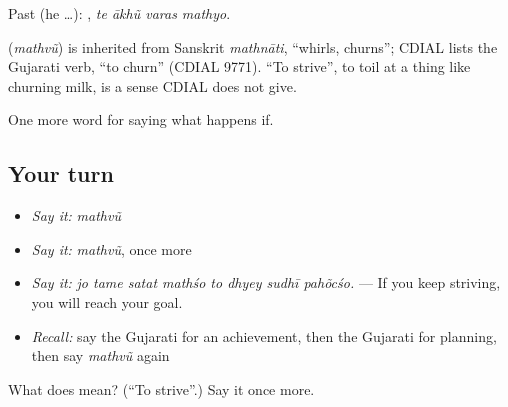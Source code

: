 Past (he …):    , \emph{te ākhũ varas mathyo}.

\begin{cousinweb}
\textbf{} (\emph{mathvũ}) is inherited from Sanskrit \emph{mathnāti}, \textquotedblleft{}whirls, churns\textquotedblright{}; CDIAL lists the Gujarati verb, \textquotedblleft{}to churn\textquotedblright{} (CDIAL 9771). \textquotedblleft{}To strive\textquotedblright{}, to toil at a thing like churning milk, is a sense CDIAL does not give.
\end{cousinweb}

\begin{grammarlens}[title={What you've built}]
One more word for saying what happens if.
\end{grammarlens}

\subsection*{Your turn}
\begin{itemize}
\raggedright
  \item \emph{Say it:} \emph{mathvũ}
  \item \emph{Say it:} \emph{mathvũ}, once more
  \item \emph{Say it:} \emph{jo tame satat mathśo to dhyey sudhī pahõcśo.} — If you keep striving, you will reach your goal.
  \item \emph{Recall:} say the Gujarati for an achievement, then the Gujarati for planning, then say \emph{mathvũ} again
\end{itemize}

\begin{tcolorbox}[breakable,colback=teal!4,colframe=teal!35!black,title={Before you move on}]
What does  mean? (\textquotedblleft{}To strive\textquotedblright{}.) Say it once more.
\end{tcolorbox}

